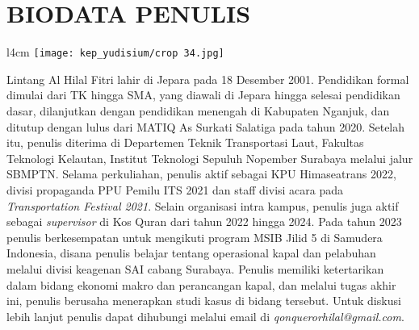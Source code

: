 \chapter{BIODATA PENULIS}

\begin{wrapfigure}{l}{4cm}
    \vspace{-20pt}
    \texttt{[image: kep\_yudisium/crop 34.jpg]}
    \vspace{-20pt}
\end{wrapfigure}

Lintang Al Hilal Fitri lahir di Jepara pada 18 Desember 2001. Pendidikan formal dimulai dari TK hingga SMA, yang diawali di Jepara hingga selesai pendidikan dasar, dilanjutkan dengan pendidikan menengah di Kabupaten Nganjuk, dan ditutup dengan lulus dari MATIQ As Surkati Salatiga pada tahun 2020. Setelah itu, penulis diterima di Departemen Teknik Transportasi Laut, Fakultas Teknologi Kelautan, Institut Teknologi Sepuluh Nopember Surabaya melalui jalur SBMPTN. Selama perkuliahan, penulis aktif sebagai KPU Himaseatrans 2022, divisi propaganda PPU Pemilu ITS 2021 dan staff divisi acara pada \emph{Transportation Festival 2021}. Selain organisasi intra kampus, penulis juga aktif sebagai \emph{supervisor} di Kos Quran dari tahun 2022 hingga 2024. Pada tahun 2023 penulis berkesempatan untuk mengikuti program MSIB Jilid 5 di Samudera Indonesia, disana penulis belajar tentang operasional kapal dan pelabuhan melalui divisi keagenan SAI cabang Surabaya. Penulis memiliki ketertarikan dalam bidang ekonomi makro dan perancangan kapal, dan melalui tugas akhir ini, penulis berusaha menerapkan studi kasus di bidang tersebut. Untuk diskusi lebih lanjut penulis dapat dihubungi melalui email di \emph{qonquerorhilal@gmail.com}.
